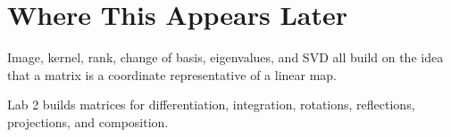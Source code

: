 \section*{Where This Appears Later}

Image, kernel, rank, change of basis, eigenvalues, and SVD all build on the
idea that a matrix is a coordinate representative of a linear map.

\begin{labbox}
Lab 2 builds matrices for differentiation, integration, rotations,
reflections, projections, and composition.
\end{labbox}


